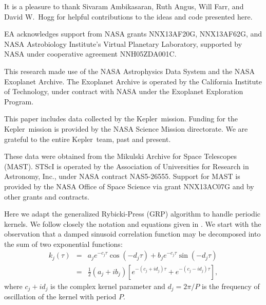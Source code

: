 \documentclass[manuscript, letterpaper]{aastex6}
\makeatletter
\let\origsection\section
\renewcommand\section{\@ifstar{\starsection}{\nostarsection}}
\newcommand\nostarsection[1]{\sectionprelude\origsection{#1}}
\newcommand\starsection[1]{\sectionprelude\origsection*{#1}}
\newcommand\sectionprelude{\vspace{1em}}
\newcommand{\project}[1]{\textsf{#1}}
\newcommand{\kepler}{\project{Kepler}}
\newcommand{\sectlabel}[1]{\label{sect:#1}}
\makeatother
\begin{document}
\acknowledgments
It is a pleasure to thank
Sivaram Ambikasaran,
Ruth Angus,
Will Farr,
and
David W.\ Hogg
for helpful contributions to the ideas and code presented here.

EA acknowledges support from NASA grants NNX13AF20G, NNX13AF62G, and
NASA Astrobiology Institute's Virtual Planetary Laboratory, supported
by NASA under cooperative agreement NNH05ZDA001C.

This research made use of the NASA \project{Astrophysics Data System} and the
NASA Exoplanet Archive.
The Exoplanet Archive is operated by the California Institute of Technology,
under contract with NASA under the Exoplanet Exploration Program.

This paper includes data collected by the \kepler\ mission. Funding for the
\kepler\ mission is provided by the NASA Science Mission directorate.
We are grateful to the entire \kepler\ team, past and present.

These data were obtained from the Mikulski Archive for Space Telescopes
(MAST).
STScI is operated by the Association of Universities for Research in
Astronomy, Inc., under NASA contract NAS5-26555.
Support for MAST is provided by the NASA Office of Space Science via grant
NNX13AC07G and by other grants and contracts.

\software{%
}

\appendix

\section{Implementation details}\sectlabel{implementation}

Here we adapt the generalized Rybicki-Press (GRP) algorithm to handle periodic kernels.  We
follow closely the notation and equations given in \citet{Ambikasaran:2015}.  We start
with the observation that a damped sinusoid correlation function may be decomposed into the sum of two
exponential functions:
\begin{eqnarray}
k_j(\tau) &=& a_j e^{-c_j\tau} \cos{(-d_j\tau)} + b_j e^{-c_j\tau} \sin{(-d_j \tau)}\\
 &=& \frac{1}{2}(a_j+ib_j)\left[e^{-(c_j+id_j) \tau}+e^{-(c_j-id_j) \tau}\right],
\end{eqnarray}
where $c_j + id_j$ is the complex kernel parameter and $d_j = 2\pi/P$
is the frequency of oscillation of the kernel with period $P$.
\end{document}
